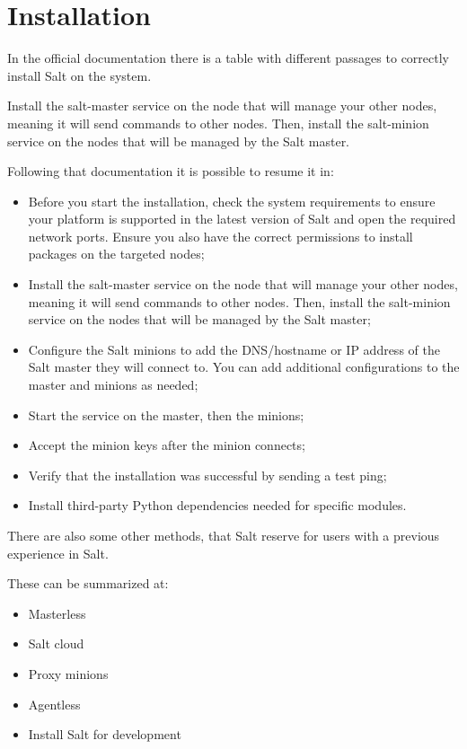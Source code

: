 \documentclass[12pt,a4paper,openright,twoside]{book}
\begin{document}
\section{Installation}

In the official documentation\cite{saltDocInstall} there is a table with different passages to correctly install Salt on the system.

Install the salt-master service on the node that will manage your other nodes, meaning it will send commands to other nodes. Then, install the salt-minion service on the nodes that will be managed by the Salt master.

Following that documentation it is possible to resume it in:

\begin{itemize}
    \item Before you start the installation, check the system requirements to ensure your platform is supported in the latest version of Salt and open the required network ports. Ensure you also have the correct permissions to install packages on the targeted nodes;
    \item Install the salt-master service on the node that will manage your other nodes, meaning it will send commands to other nodes. Then, install the salt-minion service on the nodes that will be managed by the Salt master;
    \item Configure the Salt minions to add the DNS/hostname or IP address of the Salt master they will connect to. You can add additional configurations to the master and minions as needed;
    \item Start the service on the master, then the minions;
    \item Accept the minion keys after the minion connects;
    \item Verify that the installation was successful by sending a test ping;
    \item Install third-party Python dependencies needed for specific modules.
\end{itemize}

There are also some other methods, that Salt reserve for users with a previous experience in Salt.

These can be summarized at:
\begin{itemize}
    \item Masterless
    \item Salt cloud
    \item Proxy minions
    \item Agentless
    \item Install Salt for development
\end{itemize}
\end{document}

